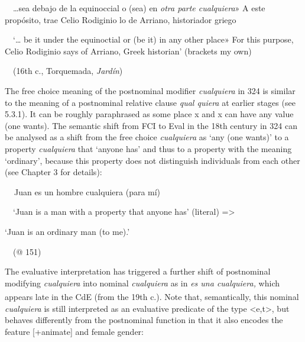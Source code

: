 \begin{styleStandard}
\ \ …sea debajo de la equinoccial o (sea) en \textit{otra parte cualquiera}» A este propósito, trae Celio Rodiginio lo de Arriano, historiador griego
\end{styleStandard}

\begin{styleStandard}
\ \ ‘… be it under the equinoctial or (be it) in any other place» For this purpose, Celio Rodiginio says of Arriano, Greek historian’ (brackets my own)
\end{styleStandard}

\begin{styleStandard}
\ \ (16th c., Torquemada,\textit{ Jardín})
\end{styleStandard}

\begin{styleStandard}
The free choice meaning of the postnominal modifier \textit{cualquiera} in 324 is similar to the meaning of a postnominal relative clause \textit{qual quiera} at earlier stages (see 5.3.1). It can be roughly paraphrased as some place x and x can have any value (one wants). The semantic shift from FCI to Eval in the 18th century in 324 can be analysed as a shift from the free choice \textit{cualquiera} as ‘any (one wants)’ to a property \textit{cualquiera} that ‘anyone has’ and thus to a property with the meaning ‘ordinary’, because this property does not distinguish individuals from each other (see Chapter 3 for details): 
\end{styleStandard}

\begin{styleStandard}
\textbf{\ \ }Juan es un hombre cualquiera (para mí)
\end{styleStandard}

\begin{styleStandard}
\ \ ‘Juan is a man with a property that anyone has’ (literal) ={\textgreater}
\end{styleStandard}

\begin{styleStandard}
‘Juan is an ordinary man (to me).’
\end{styleStandard}

\begin{styleStandard}
\ \ (@ 151)
\end{styleStandard}

\begin{styleStandard}
The evaluative interpretation has triggered a further shift of postnominal modifying \textit{cualquiera} into nominal \textit{cualquiera} as in \textit{es una cualquiera, }which appears late in the CdE (from the 19th\textsuperscript{ }c.). Note that, semantically, this nominal \textit{cualquiera} is still interpreted as an evaluative predicate of the type {\textless}e,t{\textgreater}, but behaves differently from the postnominal function in that it also encodes the feature [+animate] and female gender:
\end{styleStandard}

